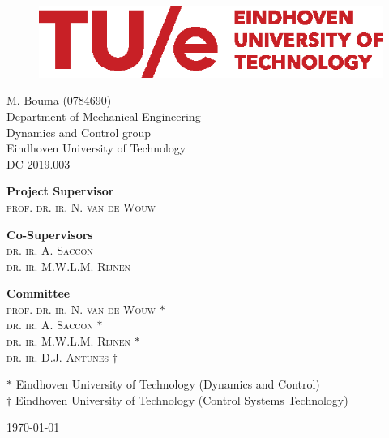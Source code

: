 \documentclass[DC2017114Bouma.tex]{subfiles}
\begin{document}
\begin{figure}[H]
\centering
\begin{minipage}{.7\textwidth}
  \includegraphics[width=1\linewidth]{TUe-logo-descriptor-line-scarlet-rgb.eps}
\end{minipage}
\end{figure}  

\begin{center}

\vspace*{20pt}
\huge{\textbf{\mytitle}}

\vspace*{30pt}
{\Large M. Bouma (0784690)}\\
\large{Department of Mechanical Engineering\\
			Dynamics and Control group\\
			Eindhoven University of Technology}\\
{\large DC 2019.003}

\end{center}

\vspace{3cm}

\begin{flushleft} 
	\textbf{Project Supervisor}\\
	\textsc{prof. dr. ir. N. van de Wouw}
\end{flushleft}
\vspace{.1cm}
\begin{flushleft} 
	\textbf{Co-Supervisors}\\
	\textsc{dr. ir. A. Saccon}\\
	\textsc{dr. ir. M.W.L.M. Rijnen}
\end{flushleft}
\vspace{.1cm}
\begin{flushleft} 
	\textbf{Committee}\\
	\textsc{prof. dr. ir. N. van de Wouw} $*$\\
	\textsc{dr. ir. A. Saccon} $*$\\
	\textsc{dr. ir. M.W.L.M. Rijnen} $*$\\
	\textsc{dr. ir. D.J. Antunes} $\dagger$
\end{flushleft}
\vfill
{\small $*$ Eindhoven University of Technology (Dynamics and Control)}\\
{\small $\dagger$ Eindhoven University of Technology (Control Systems Technology)}
\bigskip

\today
\end{document}
